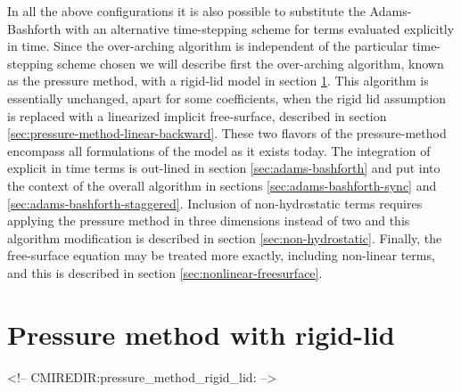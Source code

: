 In all the above configurations it is also possible to substitute the
Adams-Bashforth with an alternative time-stepping scheme for terms
evaluated explicitly in time. Since the over-arching algorithm is
independent of the particular time-stepping scheme chosen we will
describe first the over-arching algorithm, known as the pressure
method, with a rigid-lid model in section
\ref{sec:pressure-method-rigid-lid}. This algorithm is essentially
unchanged, apart for some coefficients, when the rigid lid assumption
is replaced with a linearized implicit free-surface, described in
section \ref{sec:pressure-method-linear-backward}. These two flavors
of the pressure-method encompass all formulations of the model as it
exists today. The integration of explicit in time terms is out-lined
in section \ref{sec:adams-bashforth} and put into the context of the
overall algorithm in sections \ref{sec:adams-bashforth-sync} and
\ref{sec:adams-bashforth-staggered}. Inclusion of non-hydrostatic
terms requires applying the pressure method in three dimensions
instead of two and this algorithm modification is described in section
\ref{sec:non-hydrostatic}. Finally, the free-surface equation may be
treated more exactly, including non-linear terms, and this is
described in section \ref{sec:nonlinear-freesurface}.


\section{Pressure method with rigid-lid}
\label{sec:pressure-method-rigid-lid}
\begin{rawhtml}
<!-- CMIREDIR:pressure_method_rigid_lid: -->
\end{rawhtml}

